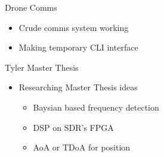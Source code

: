 \begin{frame}{Drone Comms}
    \begin{itemize}
        \item Crude comms system working
        \item Making temporary CLI interface
    \end{itemize}
\end{frame}

\begin{frame}{Tyler Master Thesis}
    \begin{itemize}
        \item Researching Master Thesis ideas
        \begin{itemize}
            \item Baysian based frequency detection
            \item DSP on SDR's FPGA
            \item AoA or TDoA for position
        \end{itemize}
    \end{itemize}
\end{frame}

